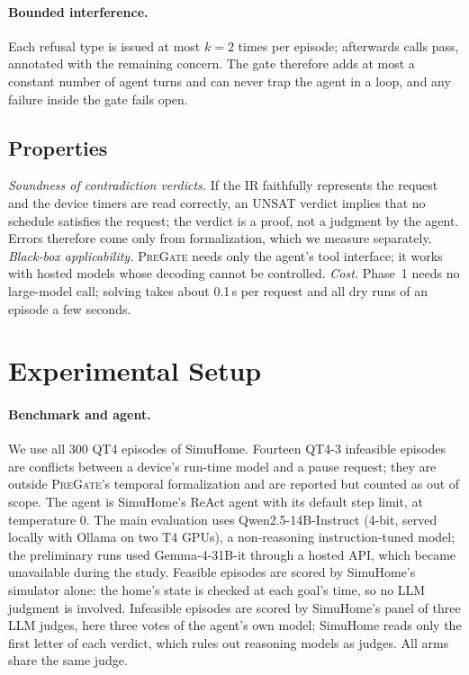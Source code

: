 \documentclass[sigconf]{aamas}
\newcommand{\sys}{\textsc{PreGate}}
\begin{document}
\paragraph{Bounded interference.} Each refusal type is issued at most $k=2$ times per episode; afterwards calls
pass, annotated with the remaining concern. The gate therefore adds at most a constant number of agent turns and
can never trap the agent in a loop, and any failure inside the gate fails open.

\subsection{Properties}

\textit{Soundness of contradiction verdicts.} If the IR faithfully represents the request and the device timers
are read correctly, an UNSAT verdict implies that no schedule satisfies the request; the verdict is a proof,
not a judgment by the agent. Errors therefore come only from formalization, which we measure separately.
\textit{Black-box applicability.} \sys{} needs only the agent's tool interface; it works with hosted models whose
decoding cannot be controlled. \textit{Cost.} Phase~1 needs no large-model call; solving takes about 0.1\,s per
request and all dry runs of an episode a few seconds.

\section{Experimental Setup}

\paragraph{Benchmark and agent.} We use all 300 QT4 episodes of SimuHome. Fourteen QT4-3 infeasible episodes are
conflicts between a device's run-time model and a pause request; they are outside \sys{}'s temporal formalization
and are reported but counted as out of scope. The agent is SimuHome's ReAct agent with its default step limit,
at temperature 0. The main evaluation uses Qwen2.5-14B-Instruct (4-bit, served locally with Ollama on two T4
GPUs), a non-reasoning instruction-tuned model; the preliminary runs used Gemma-4-31B-it through a hosted API,
which became unavailable during the study. Feasible episodes are scored by SimuHome's simulator alone: the
home's state is checked at each goal's time, so no LLM judgment is involved. Infeasible episodes are scored by
SimuHome's panel of three LLM judges, here three votes of the agent's own model; SimuHome reads only the first
letter of each verdict, which rules out reasoning models as judges. All arms share the same judge.
\end{document}
